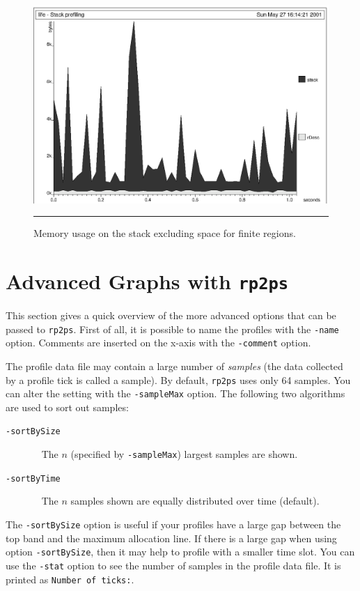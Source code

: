 \documentclass[12pt]{book}
\begin{document}
\begin{figure}
\begin{center}
\includegraphics{prof_eks3.ps}
\end{center}
\caption{Memory usage on the stack excluding space for finite regions.}
\label{prof_eks3.fig}
\medskip\hrule
\end{figure}

\section{Advanced Graphs with \texttt{rp2ps}}
This section gives a quick overview of the more advanced options that can
be passed to \texttt{rp2ps}. First of all, it is possible to name the
profiles with the 
%
{\tt -name} option. Comments are inserted on the
x-axis with the 
%
{\tt -comment} option.

The profile data file may contain a large number of \emph{samples}
(the data collected by a profile tick is called a sample). By default,
\texttt{rp2ps} uses only 64 samples. You can alter the setting with the
%
\texttt{-sampleMax} option. The following two algorithms are used to sort
out samples:
\begin{description}
\item[{\tt -sortBySize}]~
  The $n$ (specified by \texttt{-sampleMax}) largest samples are
  shown.
\item[{\tt -sortByTime}]~
  The $n$ samples shown are equally distributed over time (default).
\end{description}
The \texttt{-sortBySize} option is useful if your profiles have a
large gap between the top band and the maximum allocation line.  If
there is a large gap when using option \texttt{-sortBySize}, then it
may help to profile with a smaller time slot. You can use the
%
{\tt -stat} option to see the number of samples in the profile data
file. It is printed as \texttt{Number of ticks:}.
\end{document}
